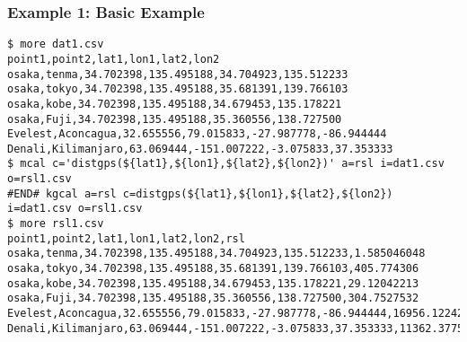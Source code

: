 \subsubsection*{Example 1: Basic Example}



\begin{Verbatim}[baselinestretch=0.7,frame=single]
$ more dat1.csv
point1,point2,lat1,lon1,lat2,lon2
osaka,tenma,34.702398,135.495188,34.704923,135.512233
osaka,tokyo,34.702398,135.495188,35.681391,139.766103
osaka,kobe,34.702398,135.495188,34.679453,135.178221
osaka,Fuji,34.702398,135.495188,35.360556,138.727500
Evelest,Aconcagua,32.655556,79.015833,-27.987778,-86.944444
Denali,Kilimanjaro,63.069444,-151.007222,-3.075833,37.353333
$ mcal c='distgps(${lat1},${lon1},${lat2},${lon2})' a=rsl i=dat1.csv o=rsl1.csv
#END# kgcal a=rsl c=distgps(${lat1},${lon1},${lat2},${lon2}) i=dat1.csv o=rsl1.csv
$ more rsl1.csv
point1,point2,lat1,lon1,lat2,lon2,rsl
osaka,tenma,34.702398,135.495188,34.704923,135.512233,1.585046048
osaka,tokyo,34.702398,135.495188,35.681391,139.766103,405.774306
osaka,kobe,34.702398,135.495188,34.679453,135.178221,29.12042213
osaka,Fuji,34.702398,135.495188,35.360556,138.727500,304.7527532
Evelest,Aconcagua,32.655556,79.015833,-27.987778,-86.944444,16956.12242
Denali,Kilimanjaro,63.069444,-151.007222,-3.075833,37.353333,11362.37758
\end{Verbatim}
